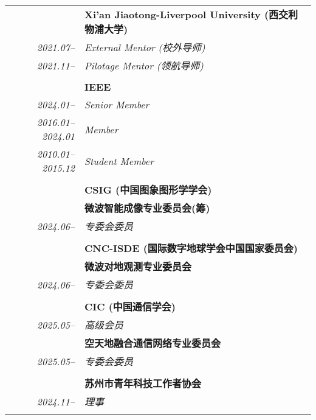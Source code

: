 \documentclass[paper=a4,fontsize=11pt]{scrartcl}
\begin{document}
\begin{longtable}{r|p{11cm}}
	
	~ & \textbf{Xi'an Jiaotong-Liverpool University (西交利物浦大学)}\\
	\emph{2021.07--} & \emph{External Mentor (校外导师)}\\
	\emph{2021.11--} & \emph{Pilotage Mentor (领航导师)}\\
	\multicolumn{2}{c}{} \\
	
	
	
	~ & \textbf{IEEE}\\
	\emph{2024.01--} & \emph{Senior Member}\\
	\emph{2016.01--2024.01} & \emph{Member}\\
	\emph{2010.01--2015.12} & \emph{Student Member}\\
	\multicolumn{2}{c}{} \\
	
	~ & \textbf{CSIG (中国图象图形学学会)}\\
	~ & \textbf{微波智能成像专业委员会(筹)} \\
	\emph{2024.06--} & \emph{专委会委员}\\
	\multicolumn{2}{c}{} \\
	
	~ & \textbf{CNC-ISDE (国际数字地球学会中国国家委员会)}\\
	~ & \textbf{微波对地观测专业委员会}\\
	\emph{2024.06--} & \emph{专委会委员}\\
	\multicolumn{2}{c}{} \\
	
	~ & \textbf{CIC (中国通信学会)}\\
	\emph{2025.05--} & \emph{高级会员}\\
	~ & \textbf{空天地融合通信网络专业委员会}\\
	\emph{2025.05--} & \emph{专委会委员}\\
	\multicolumn{2}{c}{} \\
	
	~ & \textbf{苏州市青年科技工作者协会}\\
	\emph{2024.11--} & \emph{理事}\\
	\multicolumn{2}{c}{} \\
	
	

\end{longtable}
\end{document}
